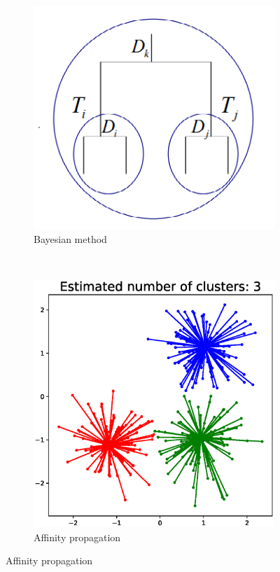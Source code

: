 \documentclass{beamer}
\begin{document}
\begin{frame}
\begin{figure}
\begin{subfigure}[b]{0.3\textwidth}
        \includegraphics[width=\textwidth]{pic/bayesian.png}
        \caption{Bayesian method}
    \end{subfigure}
    ~ %
    \begin{subfigure}[b]{0.3\textwidth}
        \includegraphics[width=\textwidth]{pic/affinity_propagation.eps}
        \caption{Affinity propagation}
    \end{subfigure}
\end{figure}
\end{frame}
\end{document}
